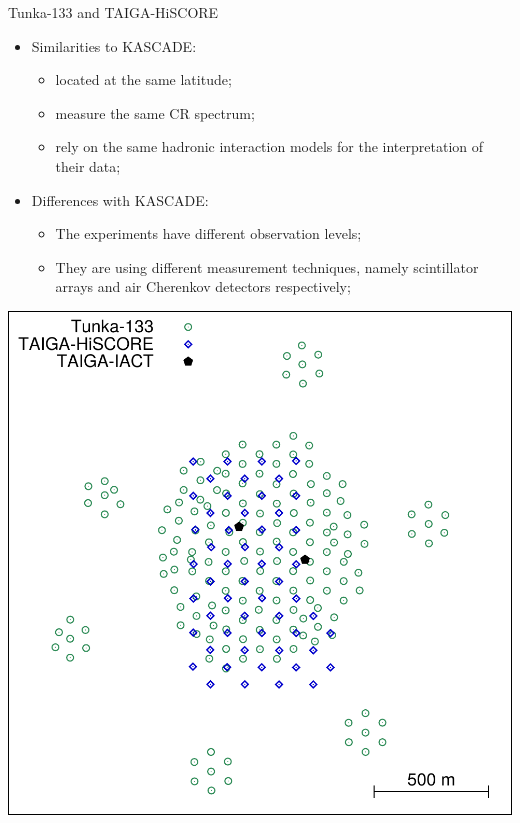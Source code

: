 
%

\begin{frame}{Tunka-133 and TAIGA-HiSCORE}
\begin{minipage}[c]{0.49\textwidth}
\begin{itemize}
  \item Similarities to KASCADE:
  \begin{itemize}
    \item located at the same latitude;
    \item measure the same CR spectrum;
    \item rely on the same hadronic interaction models for the interpretation of their data;
  \end{itemize}
  \item Differences with KASCADE:
  \begin{itemize}
    \item The experiments have different observation levels;
    \item They are using different measurement techniques, namely scintillator arrays and air Cherenkov detectors respectively;
  \end{itemize}
\end{itemize}
\end{minipage}
\hfill
\begin{minipage}[c]{0.5\textwidth}
\includegraphics[width=1\textwidth]{pics/taiga_map_133_hiscore.pdf}
\end{minipage}

\end{frame}

